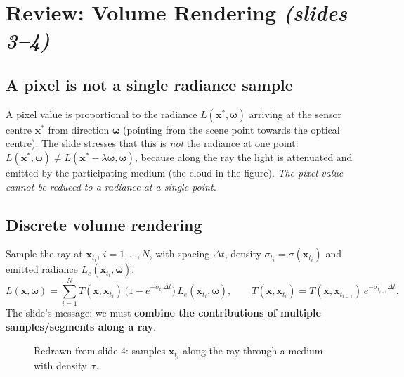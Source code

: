 \documentclass[11pt,a4paper]{article}
\newcommand{\bx}{{\bm{x}}}
\newcommand{\bom}{{\bm{\omega}}}
\begin{document}
\section{Review: Volume Rendering \emph{(slides 3--4)}}
\subsection*{A pixel is not a single radiance sample}
A pixel value is proportional to the radiance $L(\bx^*,\bom)$ arriving at the sensor centre $\bx^*$ from direction
$\bom$ (pointing from the scene point towards the optical centre). The slide stresses that this is
\emph{not} the radiance at one point: $L(\bx^*,\bom)\neq L(\bx^*-\lambda\bom,\bom)$, because along the ray the
light is attenuated and emitted by the participating medium (the cloud in the figure).
\emph{The pixel value cannot be reduced to a radiance at a single point.}

\subsection*{Discrete volume rendering}
Sample the ray at $\bx_{t_i}$, $i=1,\dots,N$, with spacing $\Delta t$, density $\sigma_{t_i}=\sigma(\bx_{t_i})$ and
emitted radiance $L_e(\bx_{t_i},\bom)$:
\begin{equation}\label{eq:vr}
L(\bx,\bom)=\sum_{i=1}^{N} T(\bx,\bx_{t_i})\,\bigl(1-e^{-\sigma_{t_i}\Delta t}\bigr)\,L_e(\bx_{t_i},\bom),
\qquad
T(\bx,\bx_{t_i})=T(\bx,\bx_{t_{i-1}})\,e^{-\sigma_{t_{i-1}}\Delta t}.
\end{equation}
The slide's message: we must \textbf{combine the contributions of multiple samples/segments along a ray}.

\begin{figure}[htbp]
\centering
{}
\caption{Redrawn from slide 4: samples $\bx_{t_i}$ along the ray through a medium with density $\sigma$.}
\end{figure}
\end{document}
